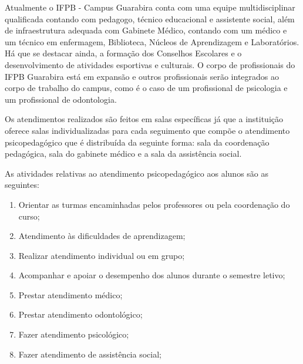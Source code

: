       Atualmente o IFPB - Campus Guarabira conta com uma equipe multidisciplinar qualificada contando com pedagogo, técnico educacional e assistente social, além de infraestrutura adequada com Gabinete Médico, contando com um m\'edico e um t\'ecnico em enfermagem, Biblioteca, Núcleos de Aprendizagem e Laboratórios. Há que se destacar ainda, a formação dos Conselhos Escolares e o desenvolvimento de atividades esportivas e culturais. O corpo de profissionais do IFPB Guarabira est\'a em expans\~ao e outros profissionais ser\~ao integrados ao corpo de trabalho do campus, como \'e o caso de um profissional de psicologia e um profissional de odontologia.


       Os atendimentos realizados são feitos em salas específicas já que a instituição oferece salas individualizadas para cada seguimento que compõe o atendimento psicopedagógico que é distribuída da seguinte forma: sala da coordenação pedagógica, sala do gabinete médico e a sala da assistência social. 

       As atividades relativas ao atendimento psicopedagógico aos alunos são as seguintes:

\begin{enumerate}
\item Orientar as turmas encaminhadas pelos professores ou pela coordenação do curso; 
\item Atendimento às dificuldades de aprendizagem;
\item Realizar atendimento individual ou em grupo;
\item Acompanhar e apoiar o desempenho dos alunos durante o semestre letivo;
\item Prestar atendimento médico;
\item Prestar atendimento odontológico;
\item Fazer atendimento psicológico;
\item Fazer atendimento de assistência social;
\end{enumerate}

